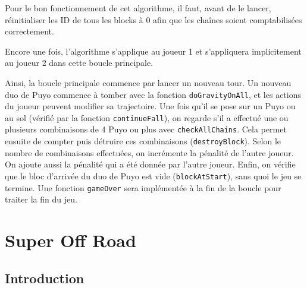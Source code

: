 \documentclass[11pt]{report}
\renewcommand{\tt}[1]{\texttt{#1}}
\begin{document}
Pour le bon fonctionnement de cet algorithme, il faut, avant de le lancer, réinitialiser les ID de tous les blocks à 0 afin que les chaînes soient comptabilisées correctement.

Encore une fois, l'algorithme s'applique au joueur 1 et s'appliquera implicitement au joueur 2 dans cette boucle principale. 


Ainsi, la boucle principale commence par lancer un nouveau tour. Un nouveau duo de Puyo commence à tomber avec la fonction \tt{doGravityOnAll}, et les actions du joueur peuvent modifier sa trajectoire.  
Une fois qu'il se pose sur un Puyo ou au sol (vérifié par la fonction \tt{continueFall}), on regarde s'il a effectué une ou plusieurs combinaisons de 4 Puyo ou plus avec \tt{checkAllChains}. Cela permet ensuite de compter puis détruire ces combinaisons (\tt{destroyBlock}). Selon le nombre de combinaisons effectuées, on incrémente la pénalité de l'autre joueur. On ajoute aussi la pénalité qui a été donnée par l'autre joueur. Enfin, on vérifie que le bloc d'arrivée du duo de Puyo est vide (\tt{blockAtStart}), sans quoi le jeu se termine. Une fonction \tt{gameOver} sera implémentée à la fin de la boucle pour traiter la fin du jeu. 








































\chapter{Super Off Road}

\section*{Introduction}
\end{document}
